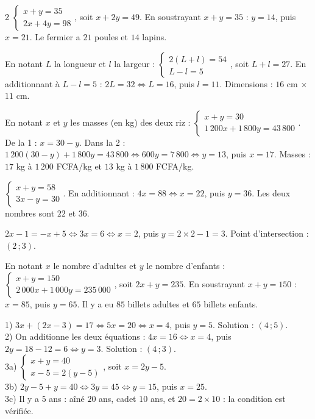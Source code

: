 \begin{multicols}{2}
$\left\{\begin{array}{l}x+y=35\\2x+4y=98\end{array}\right.$, soit $x+2y=49$. En soustrayant
$x+y=35$ : $y=14$, puis $x=21$. Le fermier a $21$ poules et $14$ lapins.

En notant $L$ la longueur et $l$ la largeur :
$\left\{\begin{array}{l}2(L+l)=54\\L-l=5\end{array}\right.$, soit $L+l=27$. En additionnant
à $L-l=5$ : $2L=32\iff L=16$, puis $l=11$. Dimensions : $16$ cm $\times$ $11$ cm.

En notant $x$ et $y$ les masses (en kg) des deux riz :
$\left\{\begin{array}{l}x+y=30\\1\,200x+1\,800y=43\,800\end{array}\right.$. De la 1\iere{} :
$x=30-y$. Dans la 2\ieme{} : $1\,200(30-y)+1\,800y=43\,800\iff600y=7\,800\iff y=13$, puis
$x=17$. Masses : $17$ kg à $1\,200$ FCFA/kg et $13$ kg à $1\,800$ FCFA/kg.

$\left\{\begin{array}{l}x+y=58\\3x-y=30\end{array}\right.$. En additionnant : $4x=88\iff
x=22$, puis $y=36$. Les deux nombres sont $22$ et $36$.

$2x-1=-x+5\iff3x=6\iff x=2$, puis $y=2\times2-1=3$. Point d'intersection : $(2\,;3)$.

En notant $x$ le nombre d'adultes et $y$ le nombre d'enfants :
$\left\{\begin{array}{l}x+y=150\\2\,000x+1\,000y=235\,000\end{array}\right.$, soit
$2x+y=235$. En soustrayant $x+y=150$ : $x=85$, puis $y=65$. Il y a eu $85$ billets adultes
et $65$ billets enfants.

1) $3x+(2x-3)=17\iff5x=20\iff x=4$, puis $y=5$. Solution : $(4\,;5)$.\\
2) On additionne les deux équations : $4x=16\iff x=4$, puis $2y=18-12=6\iff y=3$. Solution :
$(4\,;3)$.\\
3a) $\left\{\begin{array}{l}x+y=40\\x-5=2(y-5)\end{array}\right.$, soit $x=2y-5$.\\
3b) $2y-5+y=40\iff3y=45\iff y=15$, puis $x=25$.\\
3c) Il y a $5$ ans : aîné $20$ ans, cadet $10$ ans, et $20=2\times10$ : la condition est
vérifiée.


\end{multicols}
